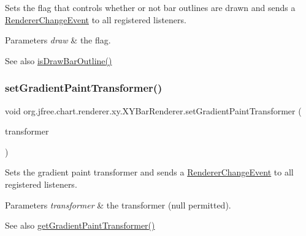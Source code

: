 Sets the flag that controls whether or not bar outlines are drawn and sends a \mbox{\hyperlink{}{Renderer\+Change\+Event}} to all registered listeners.


\begin{DoxyParams}{Parameters}
{\em draw} & the flag.\\
\hline
\end{DoxyParams}
\begin{DoxySeeAlso}{See also}
\mbox{\hyperlink{classorg_1_1jfree_1_1chart_1_1renderer_1_1xy_1_1_x_y_bar_renderer_a734b1bb783b2424117a73eacf43da834}{is\+Draw\+Bar\+Outline()}} 
\end{DoxySeeAlso}
\mbox{\label{classorg_1_1jfree_1_1chart_1_1renderer_1_1xy_1_1_x_y_bar_renderer_aa367f21104094dede9def889bcfd2940}} 
\subsubsection{\texorpdfstring{set\+Gradient\+Paint\+Transformer()}{setGradientPaintTransformer()}}
{\footnotesize\ttfamily void org.\+jfree.\+chart.\+renderer.\+xy.\+X\+Y\+Bar\+Renderer.\+set\+Gradient\+Paint\+Transformer (\begin{DoxyParamCaption}\item[{Gradient\+Paint\+Transformer}]{transformer }\end{DoxyParamCaption})}

Sets the gradient paint transformer and sends a \mbox{\hyperlink{}{Renderer\+Change\+Event}} to all registered listeners.


\begin{DoxyParams}{Parameters}
{\em transformer} & the transformer ({\ttfamily null} permitted).\\
\hline
\end{DoxyParams}
\begin{DoxySeeAlso}{See also}
\mbox{\hyperlink{classorg_1_1jfree_1_1chart_1_1renderer_1_1xy_1_1_x_y_bar_renderer_a7ecf5c18565098bb2f49783e5606cf4e}{get\+Gradient\+Paint\+Transformer()}} 
\end{DoxySeeAlso}
\mbox{\label{classorg_1_1jfree_1_1chart_1_1renderer_1_1xy_1_1_x_y_bar_renderer_ac88695bf22df4b9ed1a250fdf23639c1}} 
